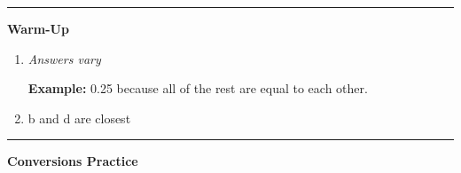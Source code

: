 \documentclass[
  letterpaper,
  DIV=11,
  numbers=noendperiod]{scrreprt}
\begin{document}
\begin{center}\rule{0.5\linewidth}{0.5pt}\end{center}

\textbf{Warm-Up}

\begin{enumerate}
\def\labelenumi{\arabic{enumi}.}
\item
  \emph{Answers vary}

  \textbf{Example:} 0.25 because all of the rest are equal to each
  other.
\item
  b and d are closest
\end{enumerate}

\begin{center}\rule{0.5\linewidth}{0.5pt}\end{center}

\textbf{Conversions Practice}
\end{document}
